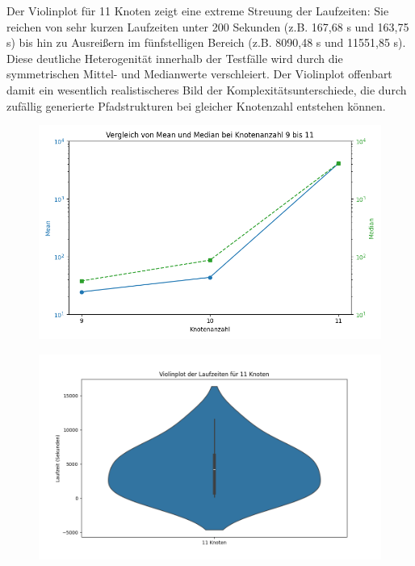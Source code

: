 \documentclass[bachelor, german]{algothesis}
\begin{document}
Der Violinplot für 11 Knoten zeigt eine extreme Streuung der Laufzeiten: Sie reichen von sehr kurzen Laufzeiten unter 200 Sekunden (z.B. 167,68 s und 163,75 s) bis hin zu Ausreißern im fünfstelligen Bereich (z.B. 8090,48 s und 11551,85 s). Diese deutliche Heterogenität innerhalb der Testfälle wird durch die symmetrischen Mittel- und Medianwerte verschleiert. Der Violinplot offenbart damit ein wesentlich realistischeres Bild der Komplexitätsunterschiede, die durch zufällig generierte Pfadstrukturen bei gleicher Knotenzahl entstehen können. \newline 
\begin{figure}[H]
    \centering
    \begin{minipage}{0.48\textwidth}
        \centering
        \includegraphics[width=\textwidth]{figures/Mean_Medain9-11.png}
        \label{fig:Median9}
    \end{minipage}
    \hfill
    \begin{minipage}{0.48\textwidth}
        \centering
        \includegraphics[width=\textwidth]{figures/11NodesViolinplot.png}
        \label{fig:Violin}
    \end{minipage}
\end{figure}
\end{document}

